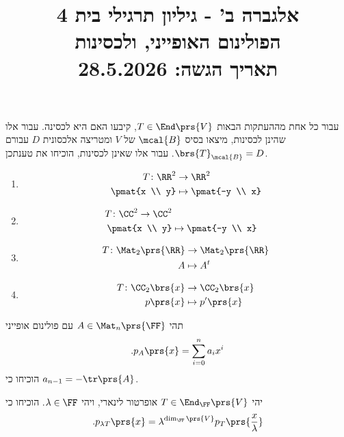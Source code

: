\documentclass[a4paper,10pt,twoside,openany]{article}
\title{
אלגברה ב' - גיליון תרגילי בית 4 \\
הפולינום האופייני, ולכסינות
\\
\vspace{1cm}
\large{תאריך הגשה: 28.5.2026}
}
\date{}
\begin{document}
\maketitle

\begin{exercise}
עבור כל אחת מההעתקות הבאות $T \in \End\prs{V}$, קיבעו האם היא לכסינה. עבור אלו שהינן לכסינות, מיצאו בסיס
$\mcal{B}$
של $V$
ומטריצה אלכסונית
$D$
עבורם
$\brs{T}_\mcal{B} = D$. עבור אלו שאינן לכסינות, הוכיחו את טענתכן.

\begin{enumerate}
\item
\begin{align*}
T \colon \RR^2 &\to \RR^2 \\
\pmat{x \\ y} &\mapsto \pmat{-y \\ x}
\end{align*}

\item
\begin{align*}
T \colon \CC^2 \to \CC^2 \\
\pmat{x \\ y} &\mapsto \pmat{-y \\ x}
\end{align*}

\item
\begin{align*}
T \colon \Mat_2\prs{\RR} &\to \Mat_2\prs{\RR} \\
A &\mapsto A^t
\end{align*}

\item
\begin{align*}
T \colon \CC_2\brs{x} &\to \CC_2\brs{x} \\
p\prs{x} &\mapsto p'\prs{x}
\end{align*}
\end{enumerate}
\end{exercise}

\begin{exercise}
תהי
$A \in \Mat_n\prs{\FF}$
עם פולינום אופייני
\begin{align*}
\text{.} p_A\prs{x} = \sum_{i=0}^n a_i x^i
\end{align*}
הוכיחו כי
$a_{n-1} = -\tr\prs{A}$.
\end{exercise}

\begin{exercise}
יהי
$T \in \End_{\FF}\prs{V}$
אופרטור לינארי, ויהי
$\lambda \in \FF$.
הוכיחו כי
\begin{align*}
\text{.} p_{\lambda T}\prs{x} = \lambda^{\dim_\FF\prs{V}} p_T\prs{\frac{x}{\lambda}}
\end{align*}
\end{exercise}
\end{document}
